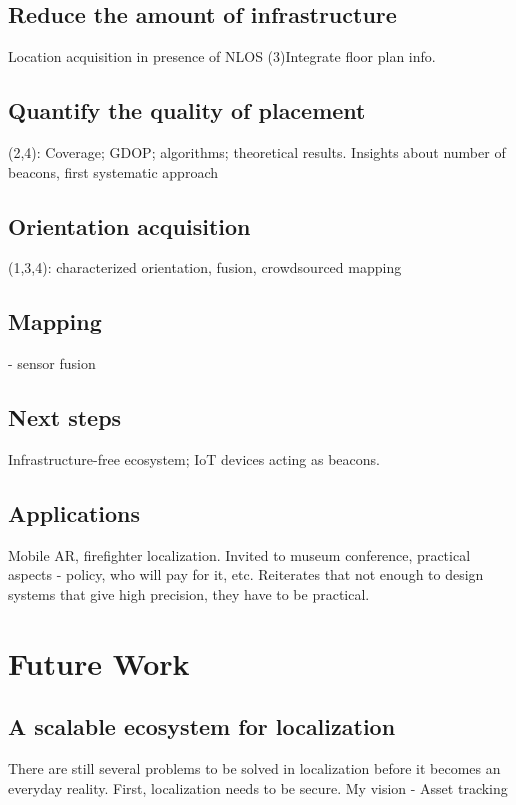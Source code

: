 \documentclass[10pt]{article}
\begin{document}
\subsection{Reduce the amount of infrastructure}
Location acquisition in presence of NLOS
(3)Integrate floor plan info.

\subsection{Quantify the quality of placement}
(2,4): Coverage; GDOP; algorithms; theoretical results.
Insights about number of beacons, first systematic approach

\subsection{Orientation acquisition}
(1,3,4): characterized orientation, fusion, crowdsourced mapping

\subsection{Mapping}
 - sensor fusion

\subsection{Next steps}
Infrastructure-free ecosystem; IoT devices acting as beacons.


\subsection{Applications} 
Mobile AR, firefighter localization. Invited to museum conference, practical aspects - policy, who will pay for it, etc. 
Reiterates that not enough to design systems that give high precision, they have to be practical. 

\section{Future Work}
\subsection{A scalable ecosystem for localization}
There are still several problems to be solved in localization before it becomes an everyday reality. First, localization needs to be secure. 
My vision - Asset tracking
\end{document}
